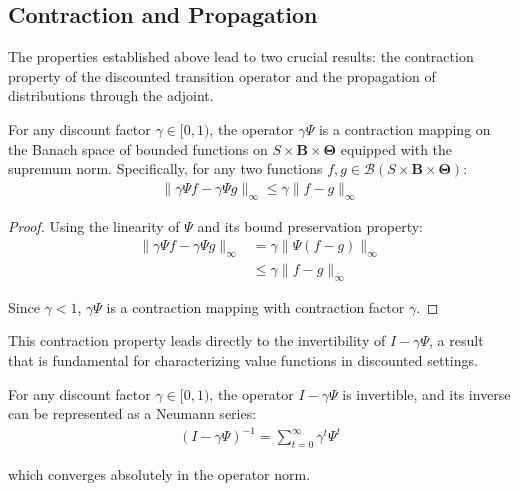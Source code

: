 \subsection{Contraction and Propagation}

The properties established above lead to two crucial results: the contraction
property of the discounted transition operator and the propagation of
distributions through the adjoint.

\begin{lemma}
    For any discount factor $\gamma \in [0,1)$, the operator $\gamma \Psi$ is a
    contraction mapping on the Banach space of bounded functions on
    $S \times \boldsymbol{B}\times \boldsymbol{\Theta}$ equipped with the supremum
    norm. Specifically, for any two functions
    $f, g \in \mathcal{B}(S \times \boldsymbol{B}\times \boldsymbol{\Theta})$:
    \begin{align}
        \|\gamma \Psi f - \gamma \Psi g\|_{\infty}\leq \gamma\|f - g\|_{\infty}
    \end{align}
\end{lemma}

\begin{proof}
    Using the linearity of $\Psi$ and its bound preservation property:
    \begin{align}
        \|\gamma \Psi f - \gamma \Psi g\|_{\infty} & = \gamma\|\Psi(f - g)\|_{\infty} \\
                                                   & \leq \gamma\|f - g\|_{\infty}
    \end{align}

    Since $\gamma < 1$, $\gamma \Psi$ is a contraction mapping with contraction
    factor $\gamma$.
\end{proof}

This contraction property leads directly to the invertibility of
$I - \gamma\Psi$, a result that is fundamental for characterizing value functions
in discounted settings.

\begin{lemma}
    For any discount factor $\gamma \in [0,1)$, the operator $I - \gamma \Psi$ is
    invertible, and its inverse can be represented as a Neumann series:
    \begin{align}
        (I - \gamma \Psi)^{-1}= \sum_{t=0}^{\infty}\gamma^{t} \Psi^{t}
    \end{align}

    which converges absolutely in the operator norm.
\end{lemma}

